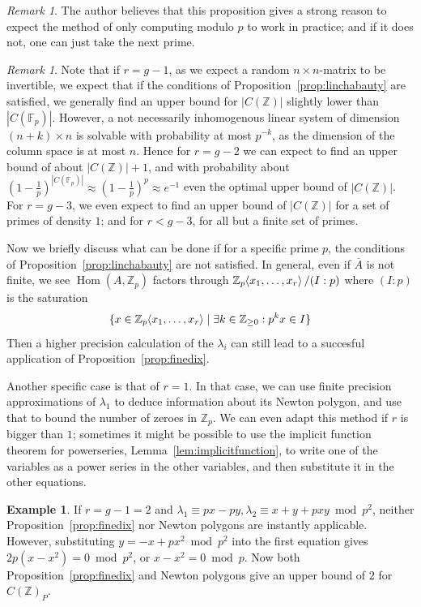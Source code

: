\documentclass[12pt]{article}
\newcommand{\Z}{\mathbb{Z}}
\newcommand{\F}{\mathbb{F}}
\renewcommand{\angle}[1]{\hspace{-2pt}\left\langle #1 \right\rangle}
\DeclareMathOperator{\Hom}{Hom}
\theoremstyle{plain}
\theoremstyle{definition}
\newtheorem{exmp}[thm]{Example} %
\theoremstyle{remark}
\newtheorem{rem}[thm]{Remark} %
\begin{document}
\begin{rem}
The author believes that this proposition gives a strong reason to expect the method of only computing modulo $p$ to work in practice; and if it does not, one can just take the next prime.
\end{rem}
\begin{rem}
Note that if $r=g-1$, as we expect a random $n\times n$-matrix to be invertible, we expect that if the conditions of Proposition~\ref{prop:linchabauty} are satisfied, we generally find an upper bound for $|C(\Z)|$ slightly lower than $|C(\F_p)|$. However, a not necessarily inhomogenous linear system of dimension $(n+k)\times n$ is solvable with probability at most $p^{-k}$, as the dimension of the column space is at most $n$. Hence for $r = g-2$ we can expect to find an upper bound of about $|C(\Z)|+1$, and with probability about $(1-\frac{1}{p})^{|C(\F_p)|} \approx (1-\frac{1}{p})^p \approx e^{-1}$ even the optimal upper bound of $|C(\Z)|$. For $r = g-3$, we even expect to find an upper bound of $|C(\Z)|$ for a set of primes of density $1$; and for $r < g-3$, for all but a finite set of primes. 
\end{rem}

Now we briefly discuss what can be done if for a specific prime $p$, the conditions of Proposition~\ref{prop:linchabauty} are not satisfied. In general, even if $\overline{A}$ is not finite, we see $\Hom(A,\Z_p)$ factors through $\Z_p\angle{x_1,\dots,x_r}/(I:p)$ where $(I:p)$ is the saturation \[\{x \in \Z_p\angle{x_1,\dots,x_r} \mid \exists k \in \Z_{\geq 0}: p^kx \in I\}\] Then a higher precision calculation of the $\lambda_i$ can still lead to a succesful application of Proposition~\ref{prop:finedix}.

Another specific case is that of $r = 1$. In that case, we can use finite precision approximations of $\lambda_1$ to deduce information about its Newton polygon, and use that to bound the number of zeroes in $\Z_p$. We can even adapt this method if $r$ is bigger than $1$; sometimes it might be possible to use the implicit function theorem for powerseries, Lemma~\ref{lem:implicitfunction}, to write one of the variables as a power series in the other variables, and then substitute it in the other equations.

\begin{exmp}
If $r = g-1 = 2$ and $\lambda_1 \equiv px-py,\lambda_2 \equiv x+y+pxy \bmod p^2$, neither Proposition~\ref{prop:finedix} nor Newton polygons are instantly applicable. However, substituting $y = -x +px^2 \bmod p^2$ into the first equation gives $2p(x-x^2) = 0 \bmod p^2$, or $x-x^2 = 0\bmod p$. Now both Proposition~\ref{prop:finedix} and Newton polygons give an upper bound of $2$ for $C(\Z)_P$.
\end{exmp}
\end{document}
